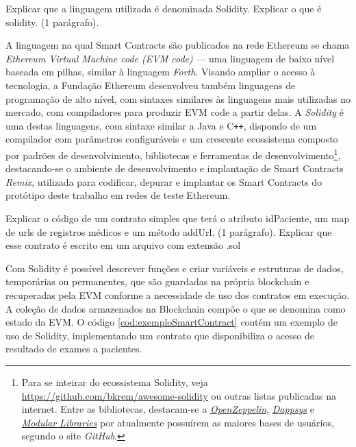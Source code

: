 \documentclass[a4paper,11pt]{article}
\begin{document}
{\color{ForestGreen}Explicar que a linguagem utilizada é denominada Solidity. Explicar o que é solidity. (1 parágrafo).}

A linguagem na qual Smart Contracts são publicados na rede Ethereum se chama \emph{Ethereum Virtual Machine code (EVM code)} --- uma linguagem de baixo nível baseada em pilhas, similar à linguagem \emph{Forth}.
Visando ampliar o acesso à tecnologia, a Fundação Ethereum desenvolveu também linguagens de programação de alto nível, com sintaxes similares às linguagens mais utilizadas no mercado, com compiladores para produzir EVM code a partir delas. A \emph{Solidity} é uma destas linguagens, com sintaxe similar a Java e C\texttt{++}, dispondo de um compilador com parâmetros configuráveis e um crescente ecossistema composto por padrões de desenvolvimento, bibliotecas e ferramentas de desenvolvimento\footnote{Para se inteirar do ecossistema Solidity, veja \href{https://github.com/bkrem/awesome-solidity}{https://github.com/bkrem/awesome-solidity} ou outras listas publicadas na internet. Entre as bibliotecas, destacam-se a \emph{\href{https://openzeppelin.com/}{OpenZeppelin}}, \emph{\href{https://github.com/dapphub/dappsys}{Dappsys}} e \emph{\href{https://github.com/modular-network/ethereum-libraries}{Modular Libraries}} por atualmente possuírem as maiores bases de usuários, segundo o site \emph{GitHub}.}, destacando-se o ambiente de desenvolvimento e implantação de Smart Contracts \emph{Remix}, utilizada para codificar, depurar e implantar os Smart Contracts do protótipo deste trabalho em redes de teste Ethereum.

{\color{ForestGreen}Explicar o código de um contrato simples que terá o atributo idPaciente, um map de urls de registros médicos e um método addUrl. (1 parágrafo). Explicar que esse contrato é escrito em um arquivo com extensão .sol}

Com Solidity é possível descrever funções e criar variáveis e estruturas de dados, temporárias ou permanentes, que são guardadas na própria blockchain e recuperadas pela EVM conforme a necessidade de uso dos contratos em execução.
A coleção de dados armazenados na Blockchain compõe o que se denomina como estado da EVM.
O código \ref{cod:exemploSmartContract} contém um exemplo de uso de Solidity, implementando um contrato que disponibiliza o acesso de resultado de exames a pacientes.
\end{document}

